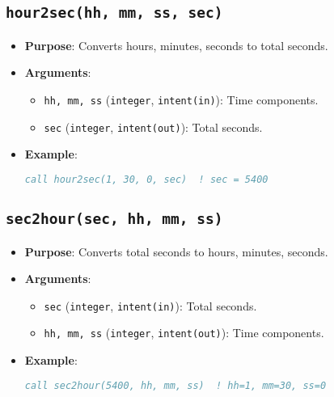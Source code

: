 \documentclass[12pt,a4paper]{report}
\begin{document}
\subsection{\texttt{hour2sec(hh, mm, ss, sec)}}
\begin{itemize}
\item \textbf{Purpose}: Converts hours, minutes, seconds to total seconds.
\item \textbf{Arguments}:
\begin{itemize}
\item \texttt{hh, mm, ss} (\texttt{integer}, \texttt{intent(in)}): Time components.
\item \texttt{sec} (\texttt{integer}, \texttt{intent(out)}): Total seconds.
\end{itemize}
\item \textbf{Example}:
\begin{lstlisting}[language=Fortran]
call hour2sec(1, 30, 0, sec)  ! sec = 5400
\end{lstlisting}
\end{itemize}

\subsection{\texttt{sec2hour(sec, hh, mm, ss)}}
\begin{itemize}
\item \textbf{Purpose}: Converts total seconds to hours, minutes, seconds.
\item \textbf{Arguments}:
\begin{itemize}
\item \texttt{sec} (\texttt{integer}, \texttt{intent(in)}): Total seconds.
\item \texttt{hh, mm, ss} (\texttt{integer}, \texttt{intent(out)}): Time components.
\end{itemize}
\item \textbf{Example}:
\begin{lstlisting}[language=Fortran]
call sec2hour(5400, hh, mm, ss)  ! hh=1, mm=30, ss=0
\end{lstlisting}
\end{itemize}
\end{document}
